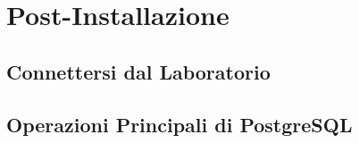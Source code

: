 \chapter{Post-Installazione}



\section{Connettersi dal Laboratorio}

\section{Operazioni Principali di PostgreSQL}
